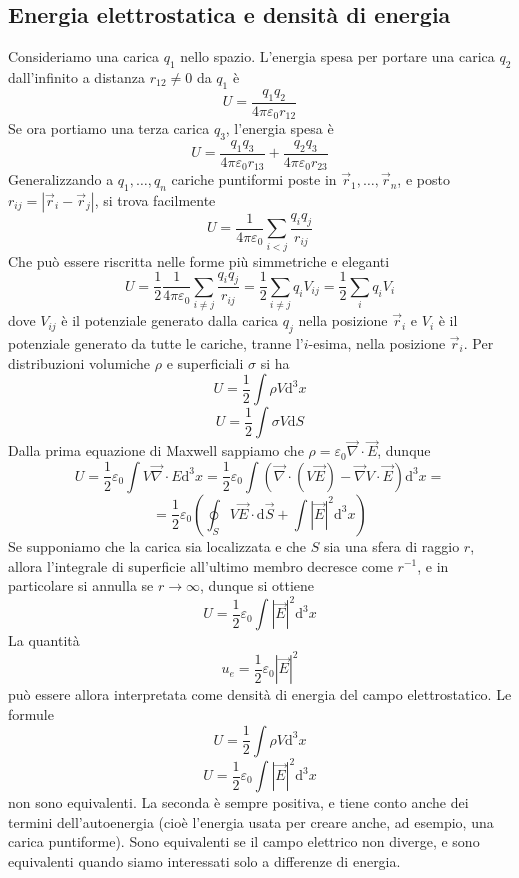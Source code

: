 \documentclass[a4paper,11pt]{book}
\let\oldnabla\nabla
\renewcommand{\nabla}{\vec{\oldnabla}}
\newcommand{\dif}{\mathrm{d}}
\let\oldepsilon\epsilon
\let\oldvarepsilon\varepsilon
\renewcommand{\epsilon}{\oldvarepsilon}
\renewcommand{\varepsilon}{\oldepsilon}
\theoremstyle{definition}
\theoremstyle{theorem}
\begin{document}
	\subsection{Energia elettrostatica e densità di energia}
	Consideriamo una carica $q_1$ nello spazio. L'energia spesa per portare una carica $q_2$ dall'infinito a distanza $r_{12}\neq0$ da $q_1$ è
	\[U=\frac{q_1q_2}{4\pi\epsilon_0r_{12}}\]
	Se ora portiamo una terza carica $q_3$, l'energia spesa è
	\[U=\frac{q_1q_3}{4\pi\epsilon_0r_{13}}+\frac{q_2q_3}{4\pi\epsilon_0r_{23}}\]
	Generalizzando a $q_1,\dots, q_n$ cariche puntiformi poste in $\vec{r}_1,\dots,\vec{r}_n$, e posto $r_{ij}=|\vec{r}_i-\vec{r}_j|$, si trova facilmente
	\[U=\frac{1}{4\pi\epsilon_0}\sum_{i<j}\frac{q_iq_j}{r_{ij}}\]
	Che può essere riscritta nelle forme più simmetriche e eleganti
	\[U=\frac{1}{2}\frac{1}{4\pi\epsilon_0}\sum_{i\neq j}\frac{q_iq_j}{r_{ij}}=\frac{1}{2}\sum_{i\neq j}q_iV_{ij}=\frac{1}{2}\sum_{i}q_iV_i\]
	dove $V_{ij}$ è il potenziale generato dalla carica $q_j$ nella posizione $\vec{r}_{i}$ e $V_i$ è il potenziale generato da tutte le cariche, tranne l'$i$-esima, nella posizione $\vec{r}_i$. Per distribuzioni volumiche $\rho$ e superficiali $\sigma$ si ha
	\[U=\frac{1}{2}\int\rho V\dif^3x\]
	\[U=\frac{1}{2}\int\sigma V\dif S\]
	Dalla prima equazione di Maxwell sappiamo che $\rho=\epsilon_0\nabla\cdot\vec{E}$, dunque
	\[U=\frac{1}{2}\epsilon_0\int V\nabla\cdot E\dif^3x=\frac{1}{2}\epsilon_0\int \left(\nabla\cdot(V\vec{E})-\nabla V\cdot\vec{E}\right)\dif^3x=\]\[=\frac{1}{2}\epsilon_0\left(\oint_S V\vec{E}\cdot\dif\vec{S}+\int|\vec{E}|^2\dif^3x\right)\]
	Se supponiamo che la carica sia localizzata e che $S$ sia una sfera di raggio $r$, allora l'integrale di superficie all'ultimo membro decresce come $r^{-1}$, e in particolare si annulla se $r\to\infty$, dunque si ottiene
	\[U=\frac{1}{2}\epsilon_0\int|\vec{E}|^2\dif^3x\]
	La quantità
	\[u_e=\frac{1}{2}\epsilon_0|\vec{E}|^2\]
	può essere allora interpretata come densità di energia del campo elettrostatico. Le formule
	\[U=\frac{1}{2}\int\rho V\dif^3x\]
	\[U=\frac{1}{2}\epsilon_0\int|\vec{E}|^2\dif^3x\]
	non sono equivalenti. La seconda è sempre positiva, e tiene conto anche dei termini dell'autoenergia (cioè l'energia usata per creare anche, ad esempio, una carica puntiforme). Sono equivalenti se il campo elettrico non diverge, e sono equivalenti quando siamo interessati solo a differenze di energia.
\end{document}
